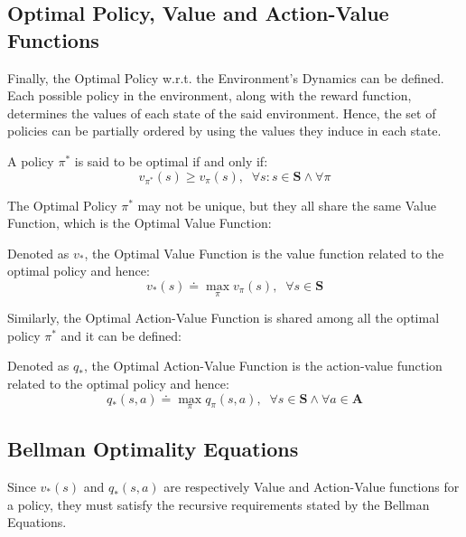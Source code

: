             
        \subsection{Optimal Policy, Value and Action-Value Functions}
            \label{subs:opt}
            Finally, the Optimal Policy w.r.t. the Environment's Dynamics can be defined. Each possible policy in the environment, along with the reward function, determines the values of each state of the said environment. Hence, the set of policies can be partially ordered by using the values they induce in each state.
            
            \begin{definition}
                \label{def:opt}
                A policy $\pi^*$ is said to be optimal if and only if:
                \[ v_{\pi^*}(s) \geq v_{\pi}(s),\;\;\forall s: s \in \mathbf{S} \land \forall \pi\]
            \end{definition}
            
            The Optimal Policy $\pi^{*}$ may not be unique, but they all share the same Value Function, which is the Optimal Value Function:
            
            \begin{definition}
                \label{def:optvalue}
                Denoted as $v_{*}$, the Optimal Value Function is the value function related to the optimal policy and hence:
                \[ v_{*}(s) \doteq \max_{\pi} v_{\pi}(s),\;\;\forall s \in \mathbf{S}\]
            \end{definition}
            
            Similarly, the Optimal Action-Value Function is shared among all the optimal policy $\pi^{*}$ and it can be defined:
            
            \begin{definition}
                \label{def:optactionvalue}
                Denoted as $q_{*}$, the Optimal Action-Value Function is the action-value function related to the optimal policy and hence:
                \[ q_{*}(s, a) \doteq \max_{\pi} q_{\pi}(s, a),\;\;\forall s \in \mathbf{S} \land \forall a \in \mathbf{A}\]
            \end{definition}
            
        \subsection{Bellman Optimality Equations}
            \label{subs:optbellman}
            Since $v_{*}(s)$ and $q_{*}(s,a)$ are respectively Value and Action-Value functions for a policy, they must satisfy the recursive requirements stated by the Bellman Equations.
            
